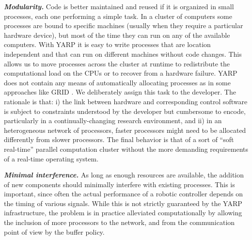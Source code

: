 \textit{\textbf{Modularity.}}
Code is better maintained and reused if it is organized in small processes,
each one performing a simple task. In a cluster of computers some processes 
are bound to specific machines (usually when they require a particular hardware 
device), but most of the time they can run on any of the available computers. 
With YARP it is easy to write processes that are location independent and 
that can run on different machines without code changes. This allows us to move 
processes across the cluster at runtime to redistribute the computational 
load on the CPUs or to recover from a hardware failure. 
YARP does not contain any means of automatically allocating processes as in 
some approaches like GRID \cite{grid}. We deliberately assign this
task to the developer.  The rationale is that: i)
the link between hardware and corresponding control software is subject
to constraints understood by the developer but cumbersome to
encode, particularly in a continually-changing research environment, and
 ii) in an heterogeneous network of processors, faster processors might 
need to be allocated differently from slower processors. The final behavior is that of 
a sort of ``soft real-time'' parallel computation cluster without the more demanding
requirements of a real-time operating system.

\textit{\textbf{Minimal interference.}}
As long as enough resources are available, the addition of new components 
should minimally interfere with existing processes. This is important, since often 
the actual performance of a robotic controller depends on the timing of various signals. 
While this is not strictly guaranteed by the YARP infrastructure, the problem is in 
practice alleviated computationally by allowing the inclusion of more processors to 
the network, and from the communication point of view by the buffer policy.

